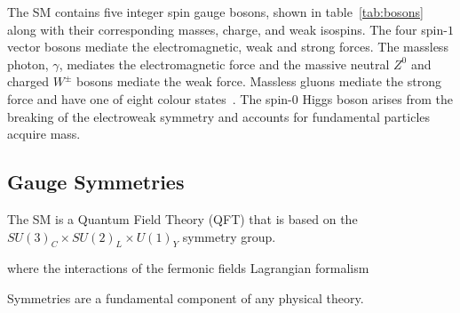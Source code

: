 The SM contains five integer spin gauge bosons, shown in table~\ref{tab:bosons} along with their corresponding masses, charge, and weak isospins.
The four spin-$1$ vector bosons mediate the electromagnetic, weak and strong forces.
The massless photon, $\gamma$, mediates the electromagnetic force and the massive neutral $Z^0$ and charged  $W^\pm$ bosons mediate the weak force.
Massless gluons mediate the strong force and have one of eight colour states~\cite{LagrangiansSM}. 
The spin-$0$ Higgs boson arises from the breaking of the electroweak symmetry and accounts for fundamental particles acquire mass.

\begin{table}[htbp]
\label{tab:bosons}
  \centering
\end{table}	

\subsection{Gauge Symmetries}\label{subsec:gaugeSymmetries}
The SM is a Quantum Field Theory (QFT) 
that is based on the $SU(3)_{C} \times SU(2)_{L} \times U(1)_{Y}$ symmetry group.



 where the interactions of the fermonic fields 
Lagrangian formalism


Symmetries are a fundamental component of any physical theory.

